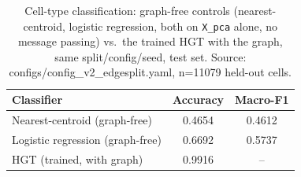 \begin{table}[h!]
\caption{Cell-type classification: graph-free controls (nearest-centroid, logistic regression, both on \texttt{X\_pca} alone, no message passing) vs.\ the trained HGT with the graph, same split/config/seed, test set. Source: configs/config\_v2\_edgesplit.yaml, n=11079 held-out cells.}
\label{tab:celltype_control}
\small
\begin{tabular}{lcc}
\hline
Classifier & Accuracy & Macro-F1 \\
\hline
Nearest-centroid (graph-free) & 0.4654 & 0.4612 \\
Logistic regression (graph-free) & 0.6692 & 0.5737 \\
HGT (trained, with graph) & 0.9916 & -- \\
\hline
\end{tabular}
\end{table}
